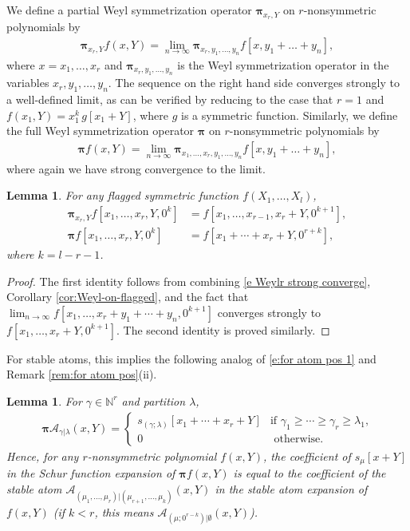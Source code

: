 \documentclass[12pt]{amsart}
\newtheorem{lemma}[thm]{Lemma}
\theoremstyle{definition}
\theoremstyle{remark}
\newcommand{\NN}{{\mathbb N}}
\newcommand{\pibold}{{\boldsymbol \pi }}
\newcommand{\Weyl}{\pibold }
\newcommand{\Acal}{{\mathcal A}}
\begin{document}
We define a partial Weyl symmetrization operator $\Weyl_{x_r, Y}$ on
$r$-nonsymmetric polynomials by
\begin{align}
\label{e Weylr strong converge} \Weyl_{x_r,Y} f(x,Y) = \lim_{n \to
\infty} \Weyl_{x_r, y_1,\dots,y_n} f[x, y_1+ \dots + y_n],
\end{align}
where $x = x_1,\dots, x_r$ and $\Weyl_{x_r, y_1,\dots, y_n}$ is the
Weyl symmetrization operator in the variables $x_r, y_1,\dots, y_n$.
The sequence on the right hand side converges strongly to a
well-defined limit, as can be verified by reducing to the case that
$r=1$ and $f(x_{1},Y) = x_{1}^{k}\, g[x_{1}+Y]$, where $g$ is a
symmetric function.  Similarly, we define the full Weyl symmetrization
operator $\Weyl$ on $r$-nonsymmetric polynomials by
\begin{align}
\label{e Weylr strong converge 2} \Weyl f(x,Y) = \lim_{n \to \infty}
\Weyl_{x_1,\dots, x_r, y_1,\dots,y_n} f[x, y_1+ \dots + y_n],
\end{align}
where again we have strong convergence to the limit.

\begin{lemma}\label{l Weyl on flag sym}
For any flagged symmetric function $f(X_1, \dots, X_{l})$,
\begin{align}\label{e Weyl on flag sym}
\Weyl_{x_r, Y} f[x_1,\dots, x_r, Y, 0^k]& = f[x_1,\ldots, x_{r-1},
x_r+ Y, 0^{k+1}],\\
\label{e Weyl on flag sym2} \Weyl f[x_1,\dots, x_r, Y, 0^k] &= f[x_1+
\cdots + x_r+ Y, 0^{r+k}],
\end{align}
where  $k = l-r-1$.
\end{lemma}
\begin{proof}
The first identity follows from combining \eqref{e Weylr strong
converge}, Corollary \ref{cor:Weyl-on-flagged}, and the fact that
$\lim_{n \to \infty} f[x_1,\dots, x_r+ y_1+\cdots + y_n, 0^{k+1}]$
converges strongly to $f[x_1,\dots, x_r+ Y, 0^{k+1}]$.  The second
identity is proved similarly.
\end{proof}

For stable atoms, this implies the following analog of
\eqref{e:for atom pos 1} and Remark \ref{rem:for atom pos}(ii).
\begin{lemma}
\label{l stable atoms}
For  $\gamma \in \NN ^{r}$ and partition $\lambda $,
\begin{align}
\label{e:Weyl stable atom}
\Weyl \Acal_{\gamma | \lambda}(x,Y)
=
\begin{cases}
s_{(\gamma;\lambda)}[x_{1}+\cdots +x_{r}+Y] & \text{if $\gamma_1 \ge
\cdots \ge \gamma_r \ge
\lambda_1$,} \\
0 & \text{ otherwise}.
\end{cases}
\end{align}
Hence, for any $r$-nonsymmetric polynomial $f(x,Y)$, the coefficient
of $s _{\mu}[x+Y]$ in the Schur function expansion of $\Weyl f(x,Y)$
is equal to the coefficient of the stable atom $\Acal_{(\mu_1,\dots,
\mu_r)| (\mu_{r+1}, \dots, \mu_k)}(x, Y)$ in the stable atom expansion
of $f(x,Y)$ (if $k<r$, this means $\Acal_{(\mu
;0^{r-k}) | \emptyset }(x, Y)$).
\end{lemma}
\end{document}
